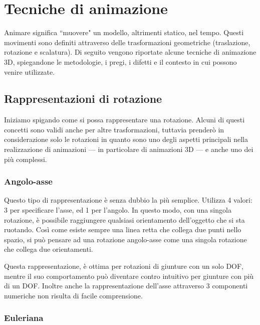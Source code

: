 
\chapter{Tecniche di animazione} %

\label{Chapter3} %

Animare significa ``muovere" un modello, altrimenti statico, nel tempo. Questi movimenti sono definiti attraverso delle trasformazioni geometriche (traslazione, rotazione e scalatura).
Di seguito vengono riportate alcune tecniche di animazione 3D, spiegandone le metodologie, i pregi, i difetti e il contesto in cui possono venire utilizzate.


\section{Rappresentazioni di rotazione}
Iniziamo spigando come si possa rappresentare una rotazione. Alcuni di questi concetti sono validi anche per altre trasformazioni, tuttavia prenderò in considerazione solo le rotazioni in quanto sono uno degli aspetti principali nella realizzazione di animazioni --- in particolare di animazioni 3D --- e anche uno dei più complessi.


\subsection{Angolo-asse}
Questo tipo di rappresentazione è senza dubbio la più semplice.
Utilizza 4 valori: 3 per specificare l'asse, ed 1 per l'angolo. In questo modo, con una singola rotazione, è possibile raggiungere qualsiasi orientamento dell'oggetto che si sta ruotando. Così come esiste sempre una linea retta che collega due punti nello spazio, si può pensare ad una rotazione angolo-asse come una singola rotazione che collega due orientamenti.

Questa rappresentazione, è ottima per rotazioni di giunture con un solo DOF, mentre il suo comportamento può diventare contro intuitivo per giunture con più di un DOF. Inoltre anche la rappresentazione dell'asse attraverso 3 componenti numeriche non risulta di facile comprensione.

\subsection{Euleriana}

